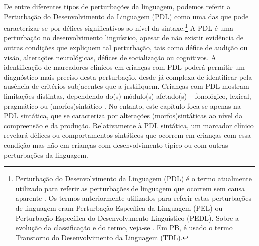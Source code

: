\documentclass[output=paper,colorlinks,citecolor=brown,booklanguage=portuguese]{langscibook}
\begin{document}
De entre diferentes tipos de perturbações da linguagem, podemos referir a Perturbação do Desenvolvimento da Linguagem (PDL) como uma das que pode caracterizar-se por défices significativos ao nível da sintaxe.\footnote{Perturbação do Desenvolvimento da Linguagem (PDL) é o termo atualmente utilizado para referir as perturbações de linguagem que ocorrem sem causa aparente \citep{Bishop2017}. Os termos anteriormente utilizados para referir estas perturbações de linguagem eram Perturbação Específica da Linguagem (PEL) ou Perturbação Específica do Desenvolvimento Linguístico (PEDL). Sobre a evolução da classificação e do termo, veja-se . Em PB, é usado o termo Transtorno do Desenvolvimento da Linguagem (TDL).}  A PDL é uma perturbação no desenvolvimento linguístico, apesar de não existir evidência de outras condições que expliquem tal perturbação, tais como défice de audição ou visão, alterações neurológicas, défices de socialização ou cognitivos. A identificação de marcadores clínicos em crianças com PDL poderá permitir um diagnóstico mais preciso desta perturbação, desde já complexa de identificar pela ausência de critérios subjacentes que a justifiquem. Crianças com PDL mostram limitações distintas, dependendo do(s) módulo(s) afetado(s) – fonológico, lexical, pragmático ou (morfos)sintático \citep{Friedmann2008}. No entanto, este capítulo foca-se apenas na PDL sintática, que se caracteriza por alterações (morfos)sintáticas ao nível da compreensão e da produção. Relativamente à PDL sintática, um marcador clínico revelará défices ou comportamentos sintáticos que ocorrem em crianças com essa condição mas não em crianças com desenvolvimento típico ou com outras perturbações da linguagem. 
\end{document}
